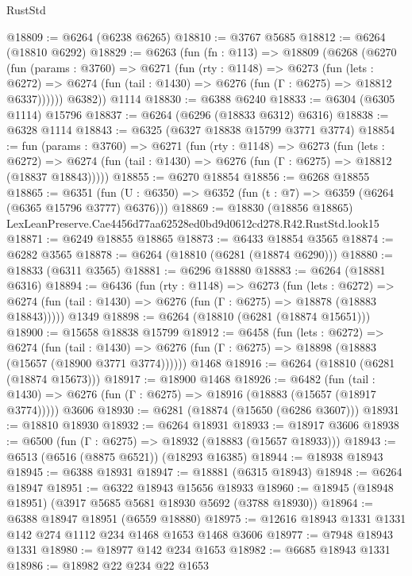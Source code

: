 \begin{lexlean}{RustStd}
\begin{coremodule}
@18809 := @6264 (@6238 @6265)
@18810 := @3767 @5685
@18812 := @6264 (@18810 @6292)
@18829 := @6263
    (fun (fn : @113) =>
    @18809
      (@6268
        (@6270
          (fun (params : @3760) =>
          @6271
            (fun (rty : @1148) =>
            @6273
              (fun (lets : @6272) =>
              @6274 (fun (tail : @1430) => @6276 (fun (Γ : @6275) => @18812 @6337))))))
        @6382))
    @1114
@18830 := @6388 @6240
@18833 := @6304 (@6305 @1114) @15796
@18837 := @6264 (@6296 (@18833 @6312) @6316)
@18838 := @6328 @1114
@18843 := @6325 (@6327 @18838 @15799 @3771 @3774)
@18854 := fun (params : @3760) =>
  @6271
    (fun (rty : @1148) =>
    @6273
      (fun (lets : @6272) =>
      @6274 (fun (tail : @1430) => @6276 (fun (Γ : @6275) => @18812 (@18837 @18843)))))
@18855 := @6270 @18854
@18856 := @6268 @18855
@18865 := @6351
    (fun (U : @6350) => @6352 (fun (t : @7) => @6359 (@6264 (@6365 @15796 @3777) @6376)))
@18869 := @18830
    (@18856 @18865)
    LexLeanPreserve.Cae4456d77aa62528ed0bd9d0612cd278.R42.RustStd.look15
@18871 := @6249 @18855 @18865
@18873 := @6433 @18854 @3565
@18874 := @6282 @3565
@18878 := @6264 (@18810 (@6281 (@18874 @6290)))
@18880 := @18833 (@6311 @3565)
@18881 := @6296 @18880
@18883 := @6264 (@18881 @6316)
@18894 := @6436
    (fun (rty : @1148) =>
    @6273
      (fun (lets : @6272) =>
      @6274 (fun (tail : @1430) => @6276 (fun (Γ : @6275) => @18878 (@18883 @18843)))))
    @1349
@18898 := @6264 (@18810 (@6281 (@18874 @15651)))
@18900 := @15658 @18838 @15799
@18912 := @6458
    (fun (lets : @6272) =>
    @6274
      (fun (tail : @1430) =>
      @6276 (fun (Γ : @6275) => @18898 (@18883 (@15657 (@18900 @3771 @3774))))))
    @1468
@18916 := @6264 (@18810 (@6281 (@18874 @15673)))
@18917 := @18900 @1468
@18926 := @6482
    (fun (tail : @1430) => @6276 (fun (Γ : @6275) => @18916 (@18883 (@15657 (@18917 @3774)))))
    @3606
@18930 := @6281 (@18874 (@15650 (@6286 @3607)))
@18931 := @18810 @18930
@18932 := @6264 @18931
@18933 := @18917 @3606
@18938 := @6500 (fun (Γ : @6275) => @18932 (@18883 (@15657 @18933)))
@18943 := @6513 (@6516 (@8875 @6521)) (@18293 @16385)
@18944 := @18938 @18943
@18945 := @6388 @18931
@18947 := @18881 (@6315 @18943)
@18948 := @6264 @18947
@18951 := @6322 @18943 @15656 @18933
@18960 := @18945 (@18948 @18951) (@3917 @5685 @5681 @18930 @5692 (@3788 @18930))
@18964 := @6388 @18947 @18951 (@6559 @18880)
@18975 := @12616 @18943 @1331 @1331 @142 @274 @1112 @234 @1468 @1653 @1468 @3606
@18977 := @7948 @18943 @1331
@18980 := @18977 @142 @234 @1653
@18982 := @6685 @18943 @1331
@18986 := @18982 @22 @234 @22 @1653

\end{coremodule}
\end{lexlean}
